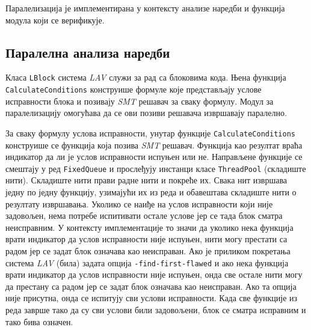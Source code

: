 \documentclass[12pt,oneside]{memoir}
\begin{document}
Паралелизација је имплементирана у контексту анализе наредби и функција модула који се верификује. 

\subsection{Паралелна анализа наредби}

Класа \texttt{LBlock} система \textit{LAV} служи за рад са блоковима кода. Њена функција \texttt{CalculateConditions} конструише формуле које представљају услове исправности блока и позивају \textit{SMT} решавач за сваку формулу. Модул за паралелизацију омогућава да се ови позиви решавача извршавају паралелно.

 За сваку формулу услова исправности, унутар функције \texttt{CalculateConditions} конструише се функција која позива \textit{SMT} решавач. Функција као резултат враћа индикатор да ли је услов исправности испуњен или не. Направљене функције се смештају у ред \texttt{FixedQueue} и прослеђују инстанци класе \texttt{ThreadPool} (складиште нити). Складиште нити прави радне нити и покреће их. Свака нит извршава једну по једну функцију, узимајући их из реда и обавештава складиште нити о резултату извршавања. Уколико се наиђе на услов исправности који није задовољен, нема потребе испитивати остале услове јер се тада блок сматра неисправним. У контексту имплементације то значи да уколико нека функција врати индикатор да услов исправности није испуњен, нити могу престати са радом јер се задат блок означава као неисправан. Ако је приликом покретања система \textit{LAV} (била) задата опција \texttt{-find-first-flawed} и ако нека функција врати индикатор да услов исправности није испуњен, онда све остале нити могу да престану са радом јер се задат блок означава као неисправан. Ако та опција није присутна, онда се испитују сви услови исправности. Када све функције из реда заврше тако да су сви услови били задовољени, блок се сматра исправним и тако бива означен. 
 
\end{document}
